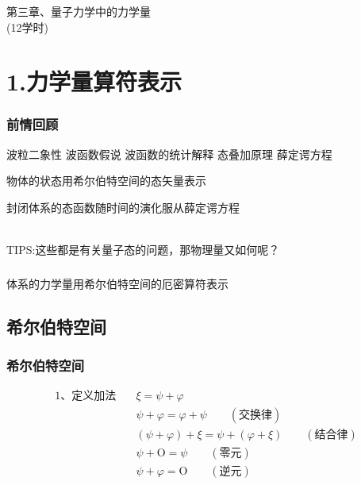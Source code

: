 \begin{frame} [plain]
    \frametitle{}
    \Background[1] 
    \begin{center}
    { {\huge 第三章、量子力学中的力学量 \\ (12学时)}}
    \end{center}  
    \addtocounter{framenumber}{-1}   
\end{frame}

\section{1.力学量算符表示}

\begin{frame}
    \frametitle{前情回顾}
    \begin{itemize}
        \Item 波粒二象性
        \Item 波函数假说
        \Item 波函数的统计解释
        \Item 态叠加原理
        \Item 薛定谔方程
    \end{itemize}
\end{frame} 

\begin{frame}    
    \begin{tcolorbox4}
    物体的状态用希尔伯特空间的态矢量表示
    \end{tcolorbox4}
    \begin{tcolorbox4}
    封闭体系的态函数随时间的演化服从薛定谔方程
    \end{tcolorbox4}
    ~~\\
    \hspace{2em}\alert{TIPS:}这些都是有关量子态的问题，那物理量又如何呢？
\end{frame} 
\begin{frame} 
    \frametitle{}
    \begin{tcolorbox4}
    体系的力学量用希尔伯特空间的厄密算符表示
    \end{tcolorbox4}
\end{frame} 

\subsection{希尔伯特空间}

\begin{frame} 
    \frametitle{希尔伯特空间}
    \begin{equation*}
        \begin{split}
            \text{1、定义加法} \quad  &\xi=\psi+\varphi\\
            &\psi+\varphi=\varphi+\psi \qquad (\text{交换律})\\
            &(\psi+\varphi)+\xi=\psi+(\varphi+\xi) \qquad (\text{结合律})\\
            &\psi+\text{O}= \psi \qquad (\text{零元})\\
            &\psi+\varphi= \text{O} \qquad (\text{逆元})\\
        \end{split}  
    \end{equation*}
\end{frame} 

